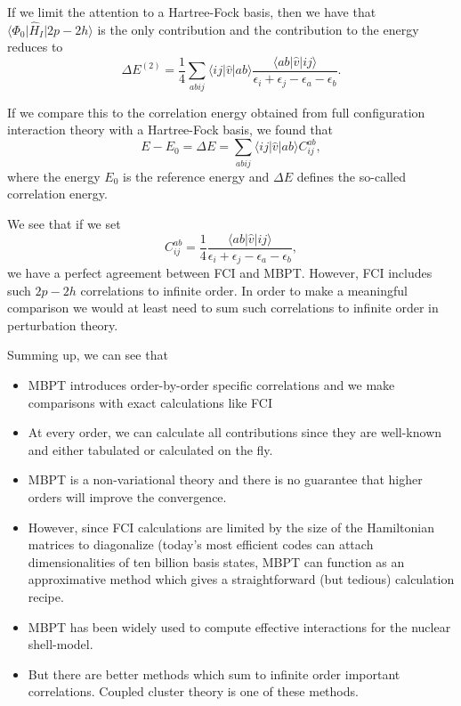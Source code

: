 \documentclass[%
twoside,                 %
final,                   %
10pt]{article}
\begin{document}
If we limit the attention to a Hartree-Fock basis, then we have that
$\langle\Phi_0\vert \hat{H}_I \vert 2p-2h\rangle$ is the only contribution and the contribution to the energy reduces to
\[
\Delta E^{(2)}=\frac{1}{4}\sum_{abij}\langle ij\vert \hat{v}\vert ab\rangle \frac{\langle ab\vert \hat{v}\vert ij\rangle}{\epsilon_i+\epsilon_j-\epsilon_a-\epsilon_b}.
\]

If we compare this to the correlation energy obtained from full configuration interaction theory with a Hartree-Fock basis, we found that
\[
E-E_0 =\Delta E=\sum_{abij}\langle ij | \hat{v}| ab \rangle C_{ij}^{ab},
\]
where the energy $E_0$ is the reference energy and $\Delta E$ defines the so-called correlation energy.

We see that if we set
\[
C_{ij}^{ab} =\frac{1}{4}\frac{\langle ab \vert \hat{v} \vert ij \rangle}{\epsilon_i+\epsilon_j-\epsilon_a-\epsilon_b},
\]
we have a perfect agreement between FCI and MBPT. However, FCI includes such $2p-2h$ correlations to infinite order. In order to make a meaningful comparison we would at least need to sum such correlations to infinite order in perturbation theory. 

Summing up, we can see that
\begin{itemize}
\item MBPT introduces order-by-order specific correlations and we make comparisons with exact calculations like FCI

\item At every order, we can calculate all contributions since they are well-known and either tabulated or calculated on the fly.

\item MBPT is a non-variational theory and there is no guarantee that higher orders will improve the convergence. 

\item However, since FCI calculations are limited by the size of the Hamiltonian matrices to diagonalize (today's most efficient codes can attach dimensionalities of ten billion basis states, MBPT can function as an approximative method which gives a straightforward (but tedious) calculation recipe. 

\item MBPT has been widely used to compute effective interactions for the nuclear shell-model.

\item But there are better methods which sum to infinite order important correlations. Coupled cluster theory is one of these methods. 
\end{itemize}
\end{document}
